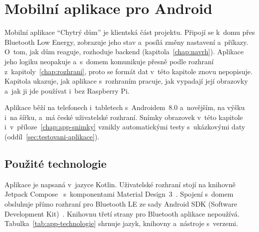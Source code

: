 \chapter{Mobilní aplikace pro Android}
\label{chap:aplikace}

Mobilní aplikace \enquote{Chytrý dům} je klientská část projektu. Připojí se k~domu přes
Bluetooth Low Energy, zobrazuje jeho stav a~posílá změny nastavení a~příkazy. O~tom, jak dům
reaguje, rozhoduje backend (kapitola~\ref{chap:navrh}). Aplikace jeho logiku neopakuje
a~s~domem komunikuje přesně podle rozhraní z~kapitoly~\ref{chap:rozhrani}, proto se formát dat
v~této kapitole znovu nepopisuje. Kapitola ukazuje, jak aplikace s~rozhraním pracuje, jak
vypadají její obrazovky a~jak ji jde používat i~bez Raspberry Pi.

Aplikace běží na telefonech i~tabletech s~Androidem~8.0 a~novějším, na výšku i~na šířku,
a~má české uživatelské rozhraní. Snímky obrazovek v~této kapitole i~v~příloze~\ref{chap:app-snimky}
vznikly automatickými testy s~ukázkovými daty (oddíl~\ref{sec:testovani-aplikace}).

\section{Použité technologie}
\label{sec:app-technologie}

Aplikace je napsaná v~jazyce Kotlin. Uživatelské rozhraní stojí na knihovně Jetpack
Compose~\cite{app-compose} s~komponentami Material Design~3~\cite{app-material3}. Spojení
s~domem obsluhuje přímo rozhraní pro Bluetooth LE ze sady Android SDK (Software Development
Kit)~\cite{app-android-ble}. Knihovnu třetí strany pro Bluetooth aplikace nepoužívá.
Tabulka~\ref{tab:app-technologie} shrnuje jazyk, knihovny a~nástroje s~verzemi.

